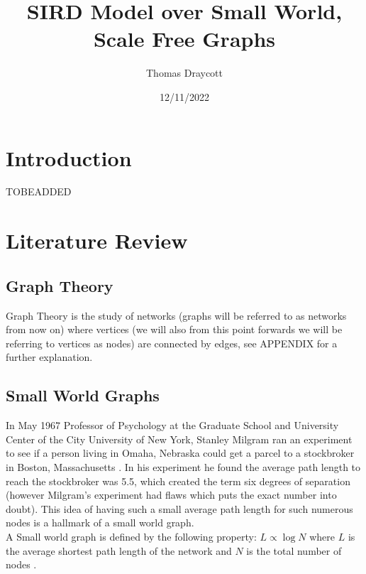 \documentclass{article}
\title{SIRD Model over Small World, Scale Free Graphs}
\date{12/11/2022}
\author{Thomas Draycott}
\begin{document}
    \maketitle
    \newpage
    \section{Introduction}
    TOBEADDED
    


    \section{Literature Review}
        \subsection{Graph Theory}
        Graph Theory is the study of networks (graphs will be referred to as networks from now on) where vertices (we will also from this point forwards we will be referring to vertices as nodes) are connected by edges, see APPENDIX for a further explanation.
        \subsection{Small World Graphs}
        In May 1967 Professor of Psychology at the Graduate School and University Center of the City University of New York, Stanley Milgram ran an experiment to see if a person living
        in Omaha, Nebraska could get a parcel to a stockbroker in Boston, Massachusetts \parencite{milgram1967small}. In his experiment he found the average path length to reach the stockbroker was 5.5, which created the term
        six degrees of separation (however Milgram's experiment had flaws which puts the exact number into doubt). This idea of having such a small average path length for such numerous nodes is a hallmark of a small world graph.
        \\A Small world graph is defined by the following property: $L\propto\log{N}$ where $L$ is the average shortest path length of the network and $N$ is the total number of nodes \parencite{Watts1998}.

    
    
    
    
\printbibliography
\end{document}
